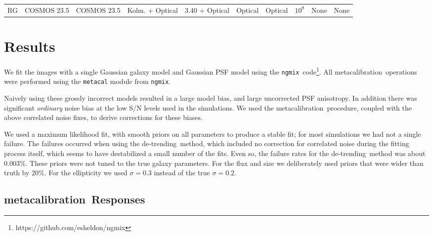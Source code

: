 \documentclass[usegraphicx,usenatbib]{mn2e}
\newcommand{\mcal}{metacalibration}
\newcommand{\nsimNgal}{$10^8$}
\newcommand{\nsimNgalTwo}{$2 \times 10^8$}
\newcommand{\nsimNStar}{$10^7$}
\newcommand{\cosmosname}{COSMOS 23.5}
\newcommand{\detrend}{de-trending}
\newcommand{\ngmix}{\texttt{ngmix}}
\begin{document}
\begin{table}
\begin{tabular}{ | l | c | c | c | c | c | c | c | c | c |}
        RG           & \cosmosname & \cosmosname & Kolm. + Optical & 3.40 + Optical  & Optical  & Optical  &  \nsimNgal   & None        & None      \\
    \end{tabular}
\end{table}


\section{Results} \label{sec:detrendsim}

We fit the images with a single Gaussian galaxy model and Gaussian PSF model
using the \ngmix\ code\footnote{https://github.com/esheldon/ngmix}.  All \mcal\
operations were performed using the \texttt{metacal} module from \ngmix.

Naively using these grossly incorrect models resulted in a large model bias,
and large uncorrected PSF anisotropy.  In addition there was significant {\em
ordinary} noise bias at the low S/N levels used in the simulations.  We used
the \mcal\ procedure, coupled with the above correlated noise fixes,
to derive corrections for these biases.

We used a maximum likelihood fit, with smooth priors on all parameters to
produce a stable fit; for most simulations we had not a single failure. The
failures occurred when using the \detrend\ method, which included no correction
for correlated noise during the fitting process itself, which seems to have
destabilized a small number of the fits.  Even so, the failure rates for the
\detrend\ method was about 0.003\%.  These priors were not tuned to the true
galaxy parameters.  For the flux and size we deliberately used priors that were
wider than truth by 20\%.  For the ellipticity we used $\sigma=0.3$ instead of
the true $\sigma=0.2$.

\subsection{\mcal\ Responses}
\end{document}
